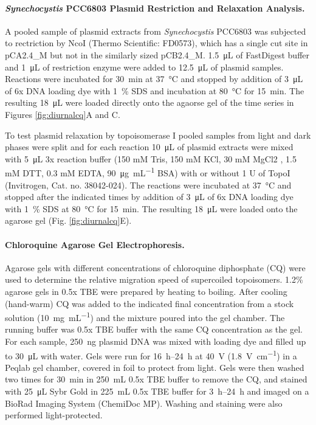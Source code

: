 \documentclass[10pt,letterpaper]{article}
\newcommand{\ugml}{\micro\gram\per\milli\liter}
\newcommand{\mL}{\milli\liter}
\newcommand{\scyst}{\textit{Synechocystis} PCC6803}
\begin{document}
\paragraph{\scyst{} Plasmid Restriction and Relaxation Analysis.}
A pooled sample of plasmid extracts from \scyst{} was subjected to
rectriction by NcoI (Thermo Scientific: FD0573), which has a single
cut site in pCA2.4\_M but not in the similarly sized pCB2.4\_M.
\SI{1.5}{\uL} of FastDigest buffer and \SI{1}{\uL} of restriction
enzyme were added to \SI{12.5}{\uL} of plasmid samples. Reactions were
incubated for \SI{30}{\minute} at \SI{37}{\celsius} and stopped by
addition of \SI{3}{\uL} of 6x DNA loading dye with \SI{1}{\percent}
SDS and incubation at \SI{80}{\celsius} for \SI{15}{\minute}. The
resulting \SI{18}{\uL} were loaded directly onto the agaorse gel of
the time series in Figures \ref{fig:diurnalcq}A and C.

To test plasmid relaxation by topoisomerase I pooled samples from
light and dark phases were split and for each reaction \SI{10}{\uL} of
plasmid extracts were mixed with \SI{5}{\uL} 3x reaction buffer (150
mM Tris, 150 mM KCl, 30 mM MgCl2 , 1.5 mM DTT, 0.3 mM EDTA,
\SI{90}{\ugml} BSA) with or without 1 U of TopoI (Invitrogen,
Cat. no. 38042-024). The reactions were incubated at \SI{37}{\celsius}
and stopped after the indicated times by addition of \SI{3}{\uL} of 6x
DNA loading dye with \SI{1}{\percent} SDS at \SI{80}{\celsius} for
\SI{15}{\minute}. The resulting \SI{18}{\uL} were loaded onto the
agarose gel (Fig. \ref{fig:diurnalcq}E).

\paragraph{Chloroquine Agarose Gel Electrophoresis.}
Agarose gels with different concentrations of chloroquine diphosphate
(CQ) were used to determine the relative migration speed of
supercoiled topoisomers. 1.2\% agarose gels in 0.5x TBE were prepared
by heating to boiling. After cooling (hand-warm) CQ was added to the
indicated final concentration from a stock solution
(\SI{10}{\milli\gram\per\milli\liter}) and the mixture poured into the
gel chamber. The running buffer was 0.5x TBE buffer with the same CQ
concentration as the gel. For each sample, \SI{250}{\ng} plasmid DNA
was mixed with loading dye and filled up to \SI{30}{\uL} with water.
Gels were run for \SIrange{16}{24}{\hour} at \SI{40}{\volt}
(\SI{1.8}{\volt\per\cm}) in a Peqlab gel chamber, covered in foil to
protect from light. Gels were then washed two times for
\SI{30}{\minute} in \SI{250}{\mL} 0.5x TBE buffer to remove the CQ,
and stained with \SI{25}{\uL} Sybr Gold in \SI{225}{\mL} 0.5x TBE
buffer for \SIrange{3}{24}{\hour} and imaged on a BioRad Imaging
System (ChemiDoc MP). Washing and staining were also performed
light-protected.
\end{document}
